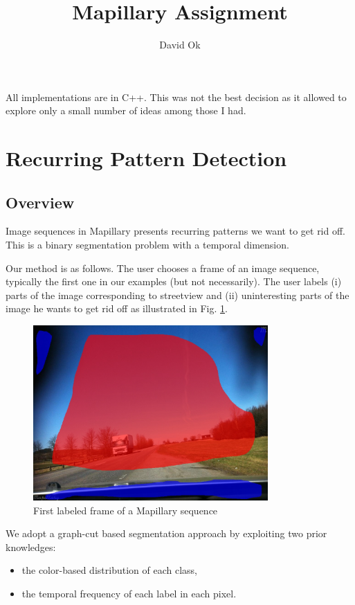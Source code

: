 \documentclass[a4paper,twoside,10pt]{article}
\begin{document}
\title{Mapillary Assignment}
\author{David Ok}
\maketitle

All implementations are in C++. This was not the best decision as it allowed to explore only a small number of ideas among those I had.

\section{Recurring Pattern Detection}

\subsection{Overview}
Image sequences in Mapillary presents recurring patterns we want to get rid off. This is a binary segmentation problem with a temporal dimension.

Our method is as follows. The user chooses a frame of an image sequence, typically the first one in our examples (but not necessarily). The user labels (i) parts of the image corresponding to streetview and (ii) uninteresting parts of the image he wants to get rid off as illustrated in Fig. \ref{fig:labeled_frame}.


\begin{figure}
	\centering
  \includegraphics[width=0.8\textwidth]{labeled_frame.jpg}
	\caption{First labeled frame of a Mapillary sequence}
	\label{fig:labeled_frame}
\end{figure}

We adopt a graph-cut based segmentation approach by exploiting two prior knowledges:
\begin{itemize}
\item the color-based distribution of each class,
\item the temporal frequency of each label in each pixel.
\end{itemize}
\end{document}
